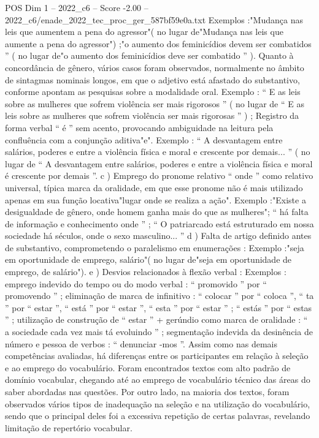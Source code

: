 \begin{textsample}{POS Dim 1 – 2022\_c6 – Score -2.00 – 2022\_c6/enade\_2022\_tec\_proc\_ger\_587bf59e0a.txt}
Exemplos :"Mudança nas leis que aumentem a pena do agressor"( no lugar de"Mudança nas leis que aumente a pena do agressor") ;"o aumento dos feminicídios devem ser combatidos ” ( no lugar de"o aumento dos feminicídios deve ser combatido ” ).
Quanto à concordância de gênero, vários casos foram observados, normalmente no âmbito de sintagmas nominais longos, em que o adjetivo está afastado do substantivo, conforme apontam as pesquisas sobre a modalidade oral.
Exemplo : “ E as leis sobre as mulheres que sofrem violência ser mais rigorosos ” ( no lugar de “ E as leis sobre as mulheres que sofrem violência ser mais rigorosas ” ) ; Registro da forma verbal “ é ” sem acento, provocando ambiguidade na leitura pela confluência com a conjunção aditiva"e".
Exemplo : “ A desvantagem entre salários, poderes e entre a violência física e moral e crescente por demais... ” ( no lugar de “ A desvantagem entre salários, poderes e entre a violência física e moral é crescente por demais ”. c ) Emprego do pronome relativo “ onde ” como relativo universal, típica marca da oralidade, em que esse pronome não é mais utilizado apenas em sua função locativa"lugar onde se realiza a ação".
Exemplo :"Existe a desigualdade de gênero, onde homem ganha mais do que as mulheres"; “ há falta de informação e conhecimento onde ” ; “ O patriarcado está estruturado em nossa sociedade há séculos, onde o sexo masculino... ” d ) Falta de artigo definido antes de substantivo, comprometendo o paralelismo em enumerações : Exemplo :"seja em oportunidade de emprego, salário"( no lugar de"seja em oportunidade de emprego, de salário"). e ) Desvios relacionados à flexão verbal : Exemplos : emprego indevido do tempo ou do modo verbal : “ promovido ” por “ promovendo ” ; eliminação de marca de infinitivo : “ colocar ” por “ coloca ”, “ ta ” por “ estar ”, “ está ” por “ estar ”, “ esta ” por “ estar ” ; “ estás ” por “ estas ” ; utilização de construção de “ estar ” + gerúndio como marca de oralidade : “ a sociedade cada vez mais tá evoluindo ” ; segmentação indevida da desinência de número e pessoa de verbos : “ denunciar -mos ”.
Assim como nas demais competências avaliadas, há diferenças entre os participantes em relação à seleção e ao emprego do vocabulário.
Foram encontrados textos com alto padrão de domínio vocabular, chegando até ao emprego de vocabulário técnico das áreas do saber abordadas nas questões.
Por outro lado, na maioria dos textos, foram observados vários tipos de inadequação na seleção e na utilização do vocabulário, sendo que o principal deles foi a excessiva repetição de certas palavras, revelando limitação de repertório vocabular.

\end{textsample}
